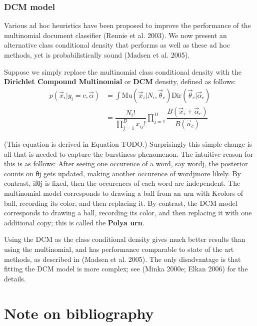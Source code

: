 \begin{refsection}
\subsubsection{DCM model}
Various ad hoc heuristics have been proposed to improve the performance of the multinomial document classifier (Rennie et al. 2003). We now present an alternative class conditional density that performs as well as these ad hoc methods, yet is probabilistically sound (Madsen et al. 2005).

Suppose we simply replace the multinomial class conditional density with the \textbf{Dirichlet Compound Multinomial} or \textbf{DCM} density, defined as follows:
\begin{equation}\begin{split}
p(\vec{x}_i|y_i=c,\vec{\alpha}) & =\int \text{Mu}(\vec{x}_i|N_i,\vec{\theta}_c)\text{Dir}(\vec{\theta}_c|\vec{\alpha}_c) \\
& =\dfrac{N_i!}{\prod_{j=1}^D x_{ij}!}\prod\limits_{j=1}^D\dfrac{B(\vec{x}_i+\vec{\alpha}_c)}{B(\vec{\alpha}_c)}
\end{split}\end{equation}

(This equation is derived in Equation TODO.) Surprisingly this simple change is all that is needed to capture the burstiness phenomenon. The intuitive reason for this is as follows: After seeing one occurence of a word, say wordj, the posterior counts on θj gets updated, making another occurence of wordjmore likely. By contrast, ifθj is fixed, then the occurences of each word are independent. The multinomial model corresponds to drawing a ball from an urn with Kcolors of ball, recording its color, and then replacing it. By contrast, the DCM model corresponds to drawing a ball, recording its color, and then replacing it with one additional copy; this is called the \textbf{Polya urn}.

Using the DCM as the class conditional density gives much better results than using the multinomial, and has performance comparable to state of the art methods, as described in (Madsen et al. 2005). The only disadvantage is that fitting the DCM model is more complex; see (Minka 2000e; Elkan 2006) for the details.



\section{Note on bibliography}


\end{refsection}




